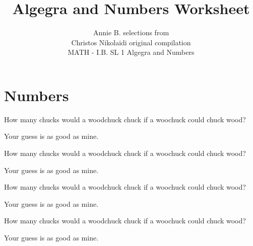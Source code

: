 \documentclass[12pt]{article}
\newenvironment{question}[2][Q]{\begin{trivlist}
\item[\hskip \labelsep {\bfseries #1}\hskip \labelsep {\bfseries #2.}]}{\end{trivlist}}
\newenvironment{answer}[2][A]{\begin{trivlist}
\item[\hskip \labelsep {\bfseries #1}\hskip \labelsep {\bfseries #2.}]}{\end{trivlist}}
\begin{document}
 
 
 
\title{Algegra and Numbers Worksheet}
\author{Annie B. selections from\\
Christos Nikolaidi original compilation\\
MATH - I.B. SL 1 Algegra and Numbers}
\maketitle

\section{Numbers}
\begin{question}{1}
  How many chucks would a woodchuck chuck if a woochuck could chuck wood?
\end{question}

\begin{answer}{1}
Your guess is as good as mine.
\end{answer}


\begin{question}{2}
  How many chucks would a woodchuck chuck if a woochuck could chuck wood?
\end{question}

\begin{answer}{2}
Your guess is as good as mine.
\end{answer}

\begin{question}{3}
  How many chucks would a woodchuck chuck if a woochuck could chuck wood?
\end{question}

\begin{answer}{3}
Your guess is as good as mine.
\end{answer}

\begin{question}{4}
  How many chucks would a woodchuck chuck if a woochuck could chuck wood?
\end{question}

\begin{answer}{4}
Your guess is as good as mine.
\end{answer}
\end{document}
